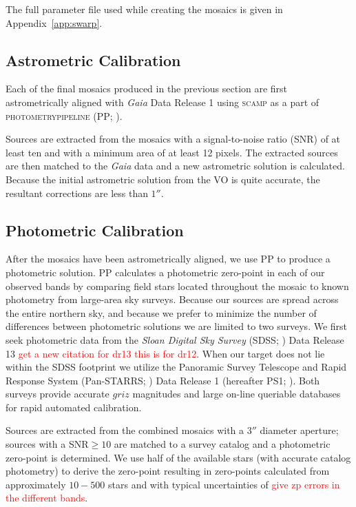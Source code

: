 \documentclass[apj, revtex4]{emulateapj}
\newcommand{\editorial}[1]{\textcolor{red}{#1}}
\begin{document}
The full parameter file used while creating the mosaics is given in Appendix~\ref{app:swarp}.

\subsection{Astrometric Calibration}
Each of the final mosaics produced in the previous section are first astrometrically aligned with \textit{Gaia} \citep{GaiaCollaboration2016} Data Release 1 \citep{GaiaCollaboration2016a} using \textsc{scamp} \citep{Bertin2006} as a part of \textsc{photometrypipeline} (PP; \citealt{Mommert2017}).

Sources are extracted from the mosaics with a signal-to-noise ratio (SNR) of at least ten and with a minimum area of at least 12 pixels. The extracted sources are then matched to the \textit{Gaia} data and a new astrometric solution is calculated. Because the initial astrometric solution from the VO is quite accurate, the resultant corrections are less than $1''$.

\subsection{Photometric Calibration}
After the mosaics have been astrometrically aligned, we use PP to produce a photometric solution. PP calculates a photometric zero-point in each of our observed bands by comparing field stars located throughout the mosaic to known photometry from large-area sky surveys. Because our sources are spread across the entire northern sky, and because we prefer to minimize the number of differences between photometric solutions we are limited to two surveys. We first seek photometric data from the \textit{Sloan Digital Sky Survey} (SDSS; \citealt{York2000}) Data Release 13 \citep{Alam2015} \editorial{get a new citation for dr13 this is for dr12}. When our target does not lie within the SDSS footprint we utilize the Panoramic Survey Telescope and Rapid Response System (Pan-STARRS; \citealt{Chambers2016}) Data Release 1 (hereafter PS1; \citealt{Flewelling2016}). Both surveys provide accurate $griz$ magnitudes and large on-line queriable databases for rapid automated calibration.

Sources are extracted from the combined mosaics with a $3''$ diameter aperture; sources with a SNR$\ge10$ are matched to a survey catalog and a photometric zero-point is determined. We use half of the available stars (with accurate catalog photometry) to derive the zero-point resulting in zero-points calculated from approximately $10-500$ stars and with typical uncertainties of \editorial{give zp errors in the different bands}.
\end{document}
